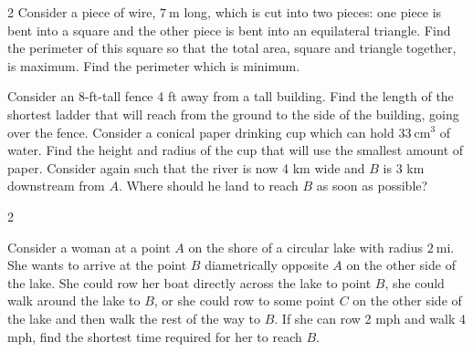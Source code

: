 \documentclass{book}
\begin{document}
\begin{enumerate}[!HW!]
\begin{paracol}{2}
\itemspade Consider a piece of wire, $7\ \text{m}$ long, which is cut into two pieces: one piece is bent into a square and the other piece is bent into an equilateral triangle. Find the perimeter of this square so that the total area, square and triangle together, is maximum. Find the perimeter which is minimum.
\switchcolumn
{}
\end{paracol}

\itemspade Consider an 8-ft-tall fence 4 ft away from a tall building. Find the length of the
shortest ladder that will reach from the ground to the side of the building, going over the fence.
\itemspade Consider a conical paper drinking cup which can hold $33\ \text{cm}^3$ of water. Find the height and radius of the cup that will use the smallest amount of paper. 
\itemspade Consider again  such that the river is now 4 km wide and $B$ is 3 km downstream from $A$. Where should he land to reach $B$ as soon as possible? 
\begin{multicols}{2}

\itemspade Consider a woman at a point $A$ on the shore of a circular lake with radius $2\ \text{mi}$. She wants to arrive at the point $B$ diametrically opposite $A$ on the other side of the lake. She could row her boat directly across the lake to point $B$, she could walk around the lake to $B$, or she could row to some point $C$ on the other side of the lake and then walk the rest of the way to $B$. If she can row 2 mph and walk 4 mph, find the shortest time required for her to reach $B$.
\end{multicols}


\end{enumerate}
\end{document}

